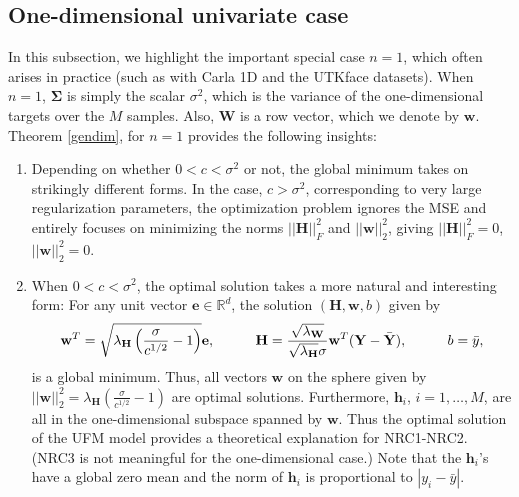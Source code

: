 \documentclass{article}
\theoremstyle{plain}
\theoremstyle{definition}
\theoremstyle{remark}
\newcommand{\bW}{{\mathbf W}}
\newcommand{\bY}{{\mathbf Y}}
\newcommand{\bH}{{\mathbf H}}
\newcommand{\bh}{{\mathbf h}}
\newcommand{\bhi}{{\mathbf h}_i}
\newcommand{\yb}{{\bar{y}}}
\newcommand{\bYb}{{\bar{\mathbf Y}}}
\newcommand{\be}{{\mathbf e}}
\newcommand{\bw}{{\mathbf w}}
\newcommand{\bSigma}{{\mathbf \Sigma}}
\newcommand{\lH}{\lambda_{\bH}}
\newcommand{\lW}{\lambda_{\bW}}
\newcommand{\Rd}{\mathbb{R}^d}
\begin{document}
\subsection{One-dimensional univariate case}
\label{sec:1d_theory}
In this subsection, we highlight the important special case $n=1$, which often arises in practice (such as with Carla 1D and the UTKface datasets). When $n=1$, $\bSigma$ is simply the scalar $\sigma^2$, which is the variance of the one-dimensional targets over the $M$ samples. 
Also, $\bW$ is a row vector, which we denote by $\bw$. 
Theorem \ref{gendim}, for $n=1$ provides the following insights:
\begin{enumerate}
    \item Depending on whether $0 < c < \sigma^2$ or not, the global minimum takes on strikingly different forms. In the case, $c > \sigma^2$, corresponding to very large regularization parameters, the optimization problem ignores the MSE and entirely focuses on minimizing the norms $||\bH||_{F}^2$ and $||\bw||_2^2$, giving $||\bH||_{F}^2 =0 $, $||\bw||_2^2 =0$.
    \item When $0<c < \sigma^2$, the optimal solution takes a more natural and interesting form:
    For any unit vector $\be \in \Rd$, the solution $(\bH, \bw, b)$ given by 
\begin{equation} \label{1doptland}
\bw^{T} = \sqrt{\lH \left(\frac{\sigma}{c^{1/2}}-1\right)} \be, \hspace{.4in}
\bH =  \frac{\sqrt{\lW}}{\sqrt{\lH} \sigma} \bw^{T} (\bY - \bYb), \hspace{.4in}
b = \yb,
\end{equation}
is a global minimum. Thus, all vectors $\bw$ on the sphere given by $||\bw||_2^2 = \lH (\frac{\sigma}{c^{1/2}}-1)$ are optimal solutions. Furthermore, $\bh_i$, $i=1,\dots,M$, are all in the one-dimensional subspace spanned by $\bw$.  Thus the optimal solution of the UFM model provides a theoretical explanation for NRC1-NRC2.
(NRC3 is not meaningful for the one-dimensional case.)
Note that the  $\bhi$'s have a global zero mean and the norm of $\bhi$ is proportional to $|y_i - \yb|$.
\end{enumerate}
\end{document}
